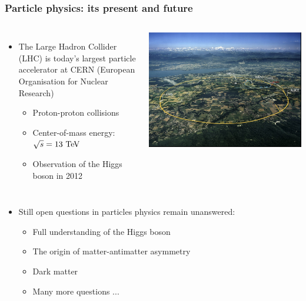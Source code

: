 


\begin{frame}
  \frametitle{Particle physics: its present and future}

  \begin{columns}
    \begin{itemize}
    \item The Large Hadron Collider (LHC) is today's largest particle
      accelerator at CERN (European Organisation for Nuclear Research)
      \begin{itemize}
      \item Proton-proton collisions
      \item Center-of-mass energy: $\sqrt{s}=13\,\mathrm{\,Te\kern -0.1em V}$
      \item Observation of the Higgs boson in 2012
      \end{itemize}
    \end{itemize}
    \centering
    \includegraphics[width=\textwidth]{figures/LHC.jpg}
  \end{columns}

      \begin{itemize}
  \item Still open questions in particles physics remain unanswered:
    \begin{itemize}
    \item Full understanding of the Higgs boson
    \item The origin of matter-antimatter asymmetry
    \item Dark matter
    \item Many more questions ...
    \end{itemize}


\end{itemize}
\end{frame}
